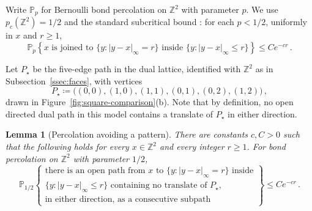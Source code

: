 \documentclass[11pt]{amsart}
\theoremstyle{plain}
\newtheorem{lemma}[theorem]{Lemma}
\theoremstyle{definition}
\newcommand{\Z}{\mathbb Z}
\renewcommand{\P}{\mathbb P}
\begin{document}
	Write $\P_p$ for Bernoulli bond percolation on $\Z^2$ with parameter $p$.
	We use $p_c(\Z^2)=1/2$ \citep{Kesten1980} and the standard subcritical bound
	\citep[Theorem~3.4]{Grimmett1989}: for each $p<1/2$, uniformly in $x$ and
	$r\geq1$,
	\begin{equation}\label{eq:square-subcritical-tail}
		\P_p\left\{x\text{ is joined to }\{y:|y-x|_\infty=r\}
		\text{ inside }\{y:|y-x|_\infty\leq r\}\right\}\leq Ce^{-cr}\, .
	\end{equation}
	
	Let $P_\star$ be the five-edge path in the dual lattice, identified with $\Z^2$
	as in Subsection~\ref{ssec:faces}, with vertices
	\begin{equation}\label{eq:square-five-edge-path}
		P_\star\coloneqq\bigl((0,0),(1,0),(1,1),(0,1),(0,2),(1,2)\bigr)\, ,
	\end{equation}
	drawn in Figure~\ref{fig:square-comparison}\textup{(b)}.  Note
	that by definition, no open directed dual path in this model
	contains a translate of $P_\star$ in either direction.
	
	\begin{lemma}[Percolation avoiding a pattern]
		\label{lem:square-constrained-bonds}
		There are constants $c,C>0$ such that the following holds for every $x\in\Z^2$
		and every integer $r\geq1$.  For bond percolation on $\Z^2$ with parameter
		$1/2$,
		\begin{equation}\label{eq:square-constrained-bond-tail}
			\P_{1/2}\left\{
			\begin{array}{c}
				\text{there is an open path from $x$ to $\{y:|y-x|_\infty=r\}$ inside}\\
				\text{$\{y:|y-x|_\infty\leq r\}$ containing no translate of $P_\star$,}\\
				\text{in either direction, as a consecutive subpath}
			\end{array}
			\right\}
			\leq Ce^{-cr}\, .
		\end{equation}
	\end{lemma}
	
\end{document}
